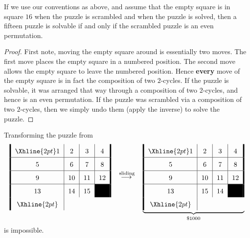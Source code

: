 \documentclass{ximera}
\begin{document}
\begin{theorem}
  If we use our conventions as above, and assume that the empty square
  is in square $16$ when the puzzle is scrambled and when the puzzle is
  solved, then a fifteen puzzle is solvable if and only if the
  scrambled puzzle is an even permutation.
  \begin{proof}
    First note, moving the empty square around is essentially two
    moves. The first move places the empty square in a numbered
    position. The second move allows the empty square to leave the
    numbered position. Hence \textbf{every} move of the empty square
    is in fact the composition of two $2$-cycles. If the puzzle is
    solvable, it was arranged that way through a composition of two
    $2$-cycles, and hence is an even permutation. If the puzzle was
    scrambled via a composition of two $2$-cycles, then we simply undo
    them (apply the inverse) to solve the puzzle.
  \end{proof}
\end{theorem}

\begin{corollary}
  Transforming the puzzle from
  \[
\arraycolsep=6pt\def\arraystretch{1.6}
\begin{array}{!{\vline width 2pt}c|c|c|c!{\vline width 2pt}}
    \Xhline{2pt}
    1  & 2  & 3  & 4 \\ \hline
    5  & 6  & 7  & 8 \\ \hline
    9  & 10 & 11 & 12 \\ \hline
    13 & 14 & 15 & \cellcolor{black} \\
    \Xhline{2pt}
\end{array}\quad\lto^{\text{sliding}}\quad
\underbrace{\begin{array}{!{\vline width 2pt}c|c|c|c!{\vline width 2pt}}
    \Xhline{2pt}
    1  & 2  & 3  & 4 \\ \hline
    5  & 6  & 7  & 8 \\ \hline
    9  & 10 & 11 & 12 \\ \hline
    13 & 15 & 14 & \cellcolor{black} \\
    \Xhline{2pt}
\end{array}}_{\$1000}
\]
is impossible.
\end{corollary}



\end{document}
